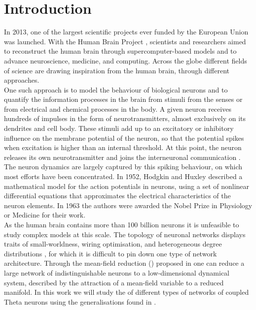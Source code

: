 \newpage
\section{Introduction}
In 2013, one of the largest scientific projects ever funded by the European Union was launched. With the Human Brain Project \cite{humanbrainproject}, scientists and researchers aimed to reconstruct the human brain through supercomputer-based models and to advance neuroscience, medicine, and computing. Across the globe different fields of science are drawing inspiration from the human brain, through different approaches. \\
One such approach is to model the behaviour of biological neurons and to quantify the information processes in the brain from stimuli from the senses or from electrical and chemical processes in the body. A given neuron receives hundreds of impulses in the form of neurotransmitters, almost exclusively on its dendrites and cell body. These stimuli add up to an excitatory or inhibitory influence on the membrane potential of the neuron, so that the potential spikes when excitation is higher than an internal threshold. At this point, the neuron releases its own neurotransmitter and joins the interneuronal communication \cite{IntroductionModelingDynamics}. The neuron dynamics are largely captured by this spiking behaviour, on which most efforts have been concentrated.
In 1952, Hodgkin and Huxley described a mathematical model for the action potentials in neurons, using a set of nonlinear differential equations that approximates the electrical characteristics of the neuron elements. In 1963 the authors were awarded the Nobel Prize in Physiology or Medicine \cite{nobel1963} for their work.\\

As the human brain contains more than 100 billion neurons \cite{Herculano2009} it is unfeasible to study complex models at this scale. The topology of neuronal networks displays traits of small-worldness, wiring optimisation, and heterogeneous degree distributions \cite{Bullmore2010}, for which it is difficult to pin down one type of network architecture. Through the mean-field reduction (\MFR) proposed in \cite{OttAntonsen2008} one can reduce a large network of indistinguishable neurons to a low-dimensional dynamical system, described by the attraction of a mean-field variable to a reduced manifold.
In this work we will study the \MFR of different types of networks of coupled Theta neurons using the generalisations found in \cite{OttAntonsen2017}. \\


